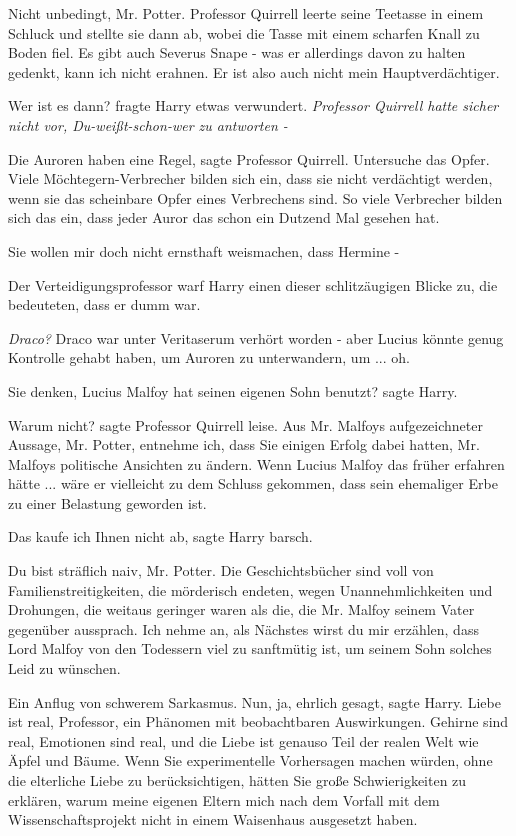 \glqq Nicht unbedingt, Mr. Potter.\grqq{} Professor Quirrell leerte seine
Teetasse in einem Schluck und stellte sie dann ab, wobei die Tasse mit einem
scharfen Knall zu Boden fiel. \glqq Es gibt auch Severus Snape - was er
allerdings davon zu halten gedenkt, kann ich nicht erahnen. Er ist also auch
nicht mein Hauptverdächtiger.\grqq{}

\glqq Wer ist es dann?\grqq{} fragte Harry etwas verwundert. \emph{Professor
Quirrell hatte sicher nicht vor, \glqq Du-weißt-schon-wer\grqq{} zu antworten -
}

\glqq Die Auroren haben eine Regel\grqq{}, sagte Professor Quirrell. \glqq
Untersuche das Opfer. Viele Möchtegern-Verbrecher bilden sich ein, dass sie
nicht verdächtigt werden, wenn sie das scheinbare Opfer eines Verbrechens sind.
So viele Verbrecher bilden sich das ein, dass jeder Auror das schon ein Dutzend
Mal gesehen hat.\grqq{}

\glqq Sie wollen mir doch nicht ernsthaft weismachen, dass Hermine -\grqq{}

Der Verteidigungsprofessor warf Harry einen dieser schlitzäugigen Blicke zu, die
bedeuteten, dass er dumm war.

\emph{Draco?} Draco war unter Veritaserum verhört worden - aber Lucius könnte
genug Kontrolle gehabt haben, um Auroren zu unterwandern, um ... oh.

\glqq Sie denken, Lucius Malfoy hat seinen eigenen Sohn benutzt?\grqq{} sagte
Harry.

\glqq Warum nicht?\grqq{} sagte Professor Quirrell leise. \glqq Aus Mr. Malfoys
aufgezeichneter Aussage, Mr. Potter, entnehme ich, dass Sie einigen Erfolg dabei
hatten, Mr. Malfoys politische Ansichten zu ändern. Wenn Lucius Malfoy das
früher erfahren hätte ... wäre er vielleicht zu dem Schluss gekommen, dass sein
ehemaliger Erbe zu einer Belastung geworden ist.\grqq{}

\glqq Das kaufe ich Ihnen nicht ab\grqq{}, sagte Harry barsch.

\glqq Du bist sträflich naiv, Mr. Potter. Die Geschichtsbücher sind voll von
Familienstreitigkeiten, die mörderisch endeten, wegen Unannehmlichkeiten und
Drohungen, die weitaus geringer waren als die, die Mr. Malfoy seinem Vater
gegenüber aussprach. Ich nehme an, als Nächstes wirst du mir erzählen, dass Lord
Malfoy von den Todessern viel zu sanftmütig ist, um seinem Sohn solches Leid zu
wünschen.\grqq{}

Ein Anflug von schwerem Sarkasmus. \glqq Nun, ja, ehrlich gesagt\grqq{}, sagte
Harry. \glqq Liebe ist real, Professor, ein Phänomen mit beobachtbaren
Auswirkungen. Gehirne sind real, Emotionen sind real, und die Liebe ist genauso
Teil der realen Welt wie Äpfel und Bäume. Wenn Sie experimentelle Vorhersagen
machen würden, ohne die elterliche Liebe zu berücksichtigen, hätten Sie große
Schwierigkeiten zu erklären, warum meine eigenen Eltern mich nach dem Vorfall
mit dem Wissenschaftsprojekt nicht in einem Waisenhaus ausgesetzt haben.\grqq{}

